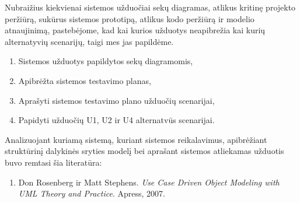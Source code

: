 \documentclass{VUMIFPSkursinis}
\begin{document}
			Nubraižius kiekvienai sistemos užduočiai sekų diagramas, atlikus kritinę projekto peržiūrą, sukūrus sistemos prototipą, atlikus kodo peržiūrą ir modelio atnaujinimą, pastebėjome, kad kai kurios užduotys neapibrežia kai kurių alternatyvių scenarijų, taigi mes jas papildėme.
			
			\begin{enumerate}
				\item Sistemos užduotys papildytos sekų diagramomis,
				\item Apibrėžta sistemos testavimo planas,
				\item Aprašyti sistemos testavimo plano užduočių scenarijai,
				\item Papidyti užduočių U1, U2 ir U4 alternatvūs scenarijai.
			\end{enumerate}
        Analizuojant kuriamą sistemą, kuriant sistemos reikalavimus, apibrėžiant struktūrinį dalykinės sryties modelį bei aprašant sistemos atliekamas užduotis buvo remtasi šia literatūra:
            \begin{enumerate}
                \item Don Rosenberg ir Matt Stephens. \textit{Use Case Driven Object Modeling with UML Theory and Practice}. Apress, 2007.
            \end{enumerate}
      
    
\end{document}
